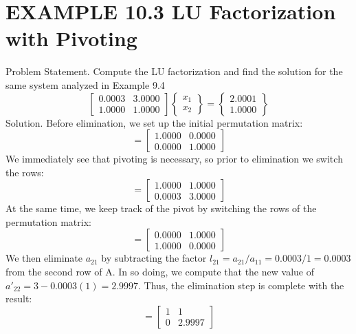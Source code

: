 \documentclass[../main.tex]{subfiles}
\begin{document}
\section*{EXAMPLE 10.3 LU Factorization with Pivoting}
Problem Statement. Compute the LU factorization and find the solution for the same
system analyzed in Example 9.4
\begin{equation}
\begin{bmatrix}
0.0003 & 3.0000\\ 
1.0000 & 1.0000
\end{bmatrix}
\begin{Bmatrix}
x_{1}\\ 
x_{2}
\end{Bmatrix}
=
\begin{Bmatrix}
2.0001\\
1.0000
\end{Bmatrix}
\end{equation}
Solution. Before elimination, we set up the initial permutation matrix:
\begin{equation}
[P]=
\begin{bmatrix}
1.0000 & 0.0000\\ 
0.0000 & 1.0000
\end{bmatrix}
\end{equation}
We immediately see that pivoting is necessary, so prior to elimination we switch the rows:
\begin{equation}
[A]=
\begin{bmatrix}
1.0000 & 1.0000\\ 
0.0003 & 3.0000
\end{bmatrix}
\end{equation}
At the same time, we keep track of the pivot by switching the rows of the permutation
matrix:
\begin{equation}
[P]=
\begin{bmatrix}
0.0000 & 1.0000\\ 
1.0000 & 0.0000
\end{bmatrix}
\end{equation}
We then eliminate $a_{21}$ by subtracting the factor $l_{21} = a_{21}/a_{11} = 0.0003/1 = 0.0003$ from the second row of A. In so doing, we compute that the new value of 
$a'_{22} = 3 - 0.0003(1) = 2.9997$. Thus, the elimination step is complete with the result:
\begin{equation}
[U]=
\begin{bmatrix}
1 & 1\\ 
0 & 2.9997
\end{bmatrix}
\end{equation}
\end{document}
